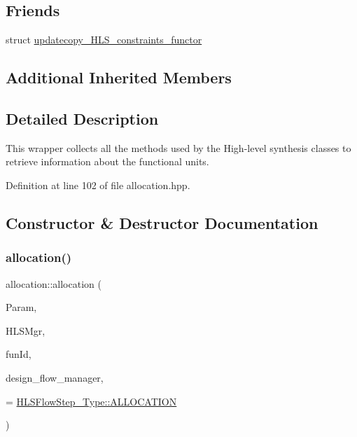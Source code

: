 \subsection*{Friends}
\begin{DoxyCompactItemize}
\item 
struct \hyperlink{classallocation_ae62048173f29362c5fb37b7b34b40f59}{updatecopy\+\_\+\+H\+L\+S\+\_\+constraints\+\_\+functor}
\end{DoxyCompactItemize}
\subsection*{Additional Inherited Members}


\subsection{Detailed Description}
This wrapper collects all the methods used by the High-\/level synthesis classes to retrieve information about the functional units. 

Definition at line 102 of file allocation.\+hpp.



\subsection{Constructor \& Destructor Documentation}
\mbox{\label{classallocation_a28d6121ea2736ac049f433e367683575}} 
\subsubsection{\texorpdfstring{allocation()}{allocation()}}
{\footnotesize\ttfamily allocation\+::allocation (\begin{DoxyParamCaption}\item[{const \hyperlink{Parameter_8hpp_a37841774a6fcb479b597fdf8955eb4ea}{Parameter\+Const\+Ref}}]{Param,  }\item[{const \hyperlink{hls__manager_8hpp_acd3842b8589fe52c08fc0b2fcc813bfe}{H\+L\+S\+\_\+manager\+Ref}}]{H\+L\+S\+Mgr,  }\item[{unsigned int}]{fun\+Id,  }\item[{const Design\+Flow\+Manager\+Const\+Ref}]{design\+\_\+flow\+\_\+manager,  }\item[{const \hyperlink{hls__step_8hpp_ada16bc22905016180e26fc7e39537f8d}{H\+L\+S\+Flow\+Step\+\_\+\+Type}}]{ = {\ttfamily \hyperlink{hls__step_8hpp_ada16bc22905016180e26fc7e39537f8daf3ade60018a383ba297f423fa621528e}{H\+L\+S\+Flow\+Step\+\_\+\+Type\+::\+A\+L\+L\+O\+C\+A\+T\+I\+ON}} }\end{DoxyParamCaption})}




